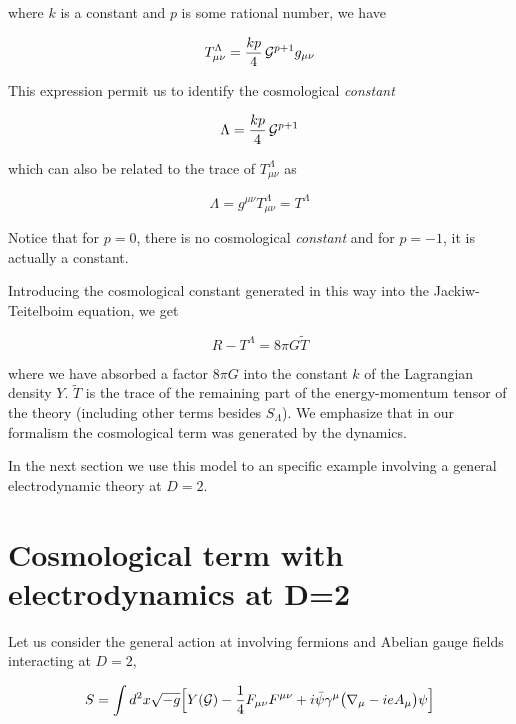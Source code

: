 \documentclass[a4paper,twocolumn,prd,groupedaddress,nofootinbib,showpacs]
{revtex4}
\begin{document}
\noindent
where $k$ is a constant and $p$ is some rational number, we have

\begin{equation}
T^\Lambda_{\mu\nu}=\frac{kp}{4}\,{\cal G}^{p+1}g_{\mu\nu}
\label{2.6}
\end{equation}

\noindent
This expression permit us to identify the cosmological {\it constant}

\begin{equation}
\Lambda=\frac{kp}{4}\,{\cal G}^{p+1}
\label{2.7}
\end{equation}

\noindent
which can also be related to the trace of $T^\Lambda_{\mu\nu}$ as

\begin{equation}
\Lambda=g^{\mu\nu}T^\Lambda_{\mu\nu}=T^\Lambda
\label{2.8}
\end{equation}

\noindent
Notice that for $p=0$, there is no cosmological {\it constant} and for
$p=-1$, it is actually a constant.

\medskip
Introducing the cosmological constant generated in this way into the
Jackiw-Teitelboim equation, we get

\begin{equation}
R-T^\Lambda=8\pi G\tilde T
\label{2.9}
\end{equation}

\noindent
where we have absorbed a factor $8\pi G$ into the constant $k$ of the
Lagrangian density $Y$. $\tilde T$ is the trace of the remaining part
of the energy-momentum tensor of the theory (including other terms
besides $S_\Lambda$). We emphasize that in our formalism the
cosmological term was generated by the dynamics.

\medskip
In the next section we use this model to an specific example
involving a general electrodynamic theory at $D=2$.

\section{Cosmological term with electrodynamics at D=2}
\renewcommand{\theequation}{3.\arabic{equation}}
\setcounter{equation}{0}

Let us consider the general action at involving fermions and Abelian
gauge fields interacting at $D=2$,

\begin{equation}
S=\int d^2x\sqrt{-g}\Bigl[Y({\cal G})
-\frac{1}{4}F_{\mu\nu}F^{\mu\nu}
+i\bar\psi\gamma^\mu\bigl(\nabla_\mu-ieA_\mu\bigr)\psi\Bigr]
\label{3.1}
\end{equation}
\end{document}
